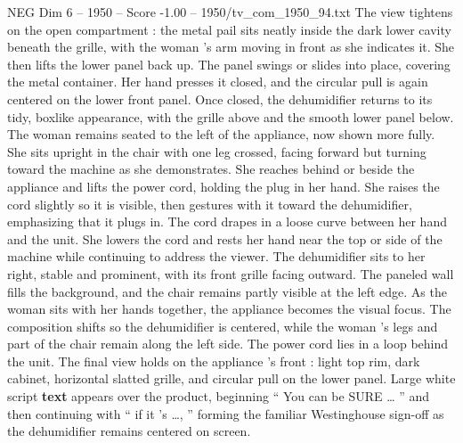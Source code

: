 \begin{textsample}{NEG Dim 6 – 1950 – Score -1.00 – 1950/tv\_com\_1950\_94.txt}
The view tightens on the open compartment : the metal pail sits neatly inside the dark lower cavity beneath the grille, with the woman ’s arm moving in front as she indicates it.
She then lifts the lower panel back up.
The panel swings or slides into place, covering the metal container.
Her hand presses it closed, and the circular pull is again centered on the lower front panel.
Once closed, the dehumidifier returns to its tidy, boxlike appearance, with the grille above and the smooth lower panel below.
The woman remains seated to the left of the appliance, now shown more fully.
She sits upright in the chair with one leg crossed, facing forward but turning toward the machine as she demonstrates.
She reaches behind or beside the appliance and lifts the power cord, holding the plug in her hand.
She raises the cord slightly so it is visible, then gestures with it toward the dehumidifier, emphasizing that it plugs in.
The cord drapes in a loose curve between her hand and the unit.
She lowers the cord and rests her hand near the top or side of the machine while continuing to address the viewer.
The dehumidifier sits to her right, stable and prominent, with its front grille facing outward.
The paneled wall fills the background, and the chair remains partly visible at the left edge.
As the woman sits with her hands together, the appliance becomes the visual focus.
The composition shifts so the dehumidifier is centered, while the woman ’s legs and part of the chair remain along the left side.
The power cord lies in a loop behind the unit.
The final view holds on the appliance ’s front : light top rim, dark cabinet, horizontal slatted grille, and circular pull on the lower panel.
Large white script \textbf{text} appears over the product, beginning “ You can be SURE … ” and then continuing with “ if it ’s …, ” forming the familiar Westinghouse sign-off as the dehumidifier remains centered on screen.

\end{textsample}
